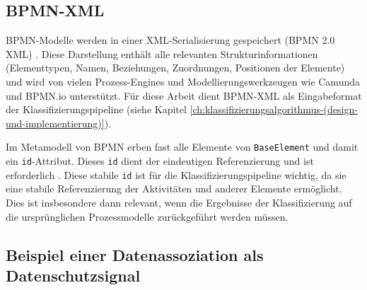 \subsection*{\ac{BPMN}-XML}

\ac{BPMN}-Modelle werden in einer XML-Serialisierung gespeichert (\ac{BPMN} 2.0 XML) \cite{omgbpmn}. Diese Darstellung enthält alle relevanten Strukturinformationen (Elementtypen, Namen, Beziehungen, Zuordnungen, Positionen der Elemente) und wird von vielen Prozess-Engines und Modellierungswerkzeugen wie Camunda \cite{camunda} und BPMN.io \cite{bpmnio} unterstützt. Für diese Arbeit dient \ac{BPMN}-XML als Eingabeformat der Klassifizierungspipeline (siehe Kapitel \ref{ch:klassifizierungsalgorithmus-(design-und-implementierung)}).

Im Metamodell von \ac{BPMN} erben fast alle Elemente von \texttt{BaseElement} und damit ein \texttt{id}-Attribut. Dieses \texttt{id} dient der eindeutigen Referenzierung und ist erforderlich \cite{omgbpmn}. Diese stabile \texttt{id} ist für die Klassifizierungspipeline wichtig, da sie eine stabile Referenzierung der Aktivitäten und anderer Elemente ermöglicht. Dies ist insbesondere dann relevant, wenn die Ergebnisse der Klassifizierung auf die ursprünglichen Prozessmodelle zurückgeführt werden müssen.

\subsection*{Beispiel einer Datenassoziation als Datenschutzsignal}

